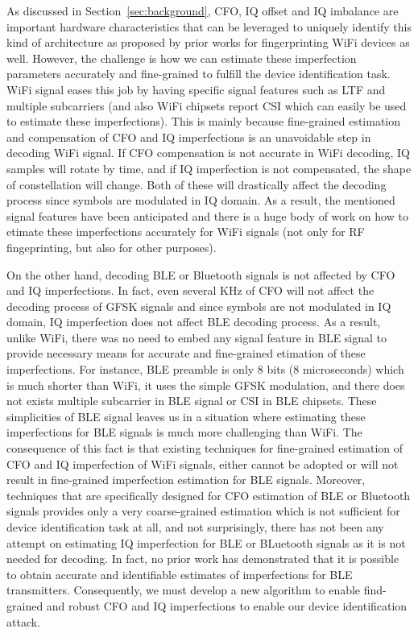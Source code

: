 As discussed in Section~\ref{sec:background}, CFO, IQ offset and IQ imbalance are important hardware characteristics that can be leveraged to uniquely identify this kind of architecture as proposed by prior works for fingerprinting WiFi devices as well. However, the challenge is how we can estimate these imperfection parameters accurately and fine-grained to fulfill the device identification task. WiFi signal eases this job by having specific signal features such as LTF and multiple subcarriers (and also WiFi chipsets report CSI which can easily be used to estimate these imperfections). This is mainly because fine-grained estimation and compensation of CFO and IQ imperfections is an unavoidable step in decoding WiFi signal. If CFO compensation is not accurate in WiFi decoding, IQ samples will rotate by time, and if IQ imperfection is not compensated, the shape of constellation will change. Both of these will drastically affect the decoding process since symbols are modulated in IQ domain. As a result, the mentioned signal features have been anticipated and there is a huge body of work on how to etimate these imperfections accurately for WiFi signals (not only for RF fingeprinting, but also for other purposes).


On the other hand, decoding BLE or Bluetooth signals is not affected by CFO and IQ imperfections. In fact, even several KHz of CFO will not affect the decoding process of GFSK signals and since symbols are not modulated in IQ domain, IQ imperfection does not affect BLE decoding process. As a result, unlike WiFi, there was no need to embed any signal feature in BLE signal to provide necessary means for accurate and fine-grained etimation of these imperfections. For instance, BLE preamble is only 8 bits (8 microseconds) which is much shorter than WiFi, it uses the simple GFSK modulation, and there does not exists multiple subcarrier in BLE signal or CSI in BLE chipsets. These simplicities of BLE signal leaves us in a situation where estimating these imperfections for BLE signals is much more challenging than WiFi. The consequence of this fact is that existing techniques for fine-grained estimation of CFO and IQ imperfection of WiFi signals, either cannot be adopted or will not result in fine-grained imperfection estimation for BLE signals. Moreover, techniques that are specifically designed for CFO estimation of BLE or Bluetooth signals provides only a very coarse-grained estimation which is not sufficient for device identification task at all, and not surprisingly, there has not been any attempt on estimating IQ imperfection for BLE or BLuetooth signals as it is not needed for decoding. In fact, no prior work has demonstrated that it is possible to obtain accurate and identifiable estimates of imperfections for BLE transmitters. Consequently, we must develop a new algorithm to enable find-grained and robust CFO and IQ imperfections to enable our device identification attack.


